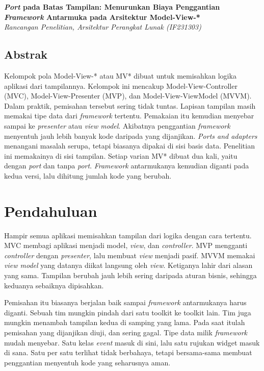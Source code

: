 \documentclass[11pt,a4paper]{article}
\begin{document}
\begin{center}
  {\LARGE\bfseries \textit{Port} pada Batas Tampilan: Menurunkan Biaya Penggantian \textit{Framework} Antarmuka pada Arsitektur Model-View-*}\\[0.6em]
  {\small\itshape Rancangan Penelitian, Arsitektur Perangkat Lunak (IF231303)}
\end{center}

\vspace{1em}

\subsection*{Abstrak}

Kelompok pola Model-View-* atau MV* dibuat untuk memisahkan logika aplikasi dari tampilannya. Kelompok ini mencakup Model-View-Controller (MVC), Model-View-Presenter (MVP), dan Model-View-ViewModel (MVVM). Dalam praktik, pemisahan tersebut sering tidak tuntas. Lapisan tampilan masih memakai tipe data dari \textit{framework} tertentu. Pemakaian itu kemudian menyebar sampai ke \textit{presenter} atau \textit{view model}. Akibatnya penggantian \textit{framework} menyentuh jauh lebih banyak kode daripada yang dijanjikan. \textit{Ports and adapters} menangani masalah serupa, tetapi biasanya dipakai di sisi basis data. Penelitian ini memakainya di sisi tampilan. Setiap varian MV* dibuat dua kali, yaitu dengan \textit{port} dan tanpa \textit{port}. \textit{Framework} antarmukanya kemudian diganti pada kedua versi, lalu dihitung jumlah kode yang berubah.

\section{Pendahuluan}

Hampir semua aplikasi memisahkan tampilan dari logika dengan cara tertentu. MVC membagi aplikasi menjadi model, \textit{view}, dan \textit{controller}. MVP mengganti \textit{controller} dengan \textit{presenter}, lalu membuat \textit{view} menjadi pasif. MVVM memakai \textit{view model} yang datanya diikat langsung oleh \textit{view}. Ketiganya lahir dari alasan yang sama. Tampilan berubah jauh lebih sering daripada aturan bisnis, sehingga keduanya sebaiknya dipisahkan.

Pemisahan itu biasanya berjalan baik sampai \textit{framework} antarmukanya harus diganti. Sebuah tim mungkin pindah dari satu toolkit ke toolkit lain. Tim juga mungkin menambah tampilan kedua di samping yang lama. Pada saat itulah pemisahan yang dijanjikan diuji, dan sering gagal. Tipe data milik \textit{framework} mudah menyebar. Satu kelas \textit{event} masuk di sini, lalu satu rujukan widget masuk di sana. Satu per satu terlihat tidak berbahaya, tetapi bersama-sama membuat penggantian menyentuh kode yang seharusnya aman.
\end{document}
